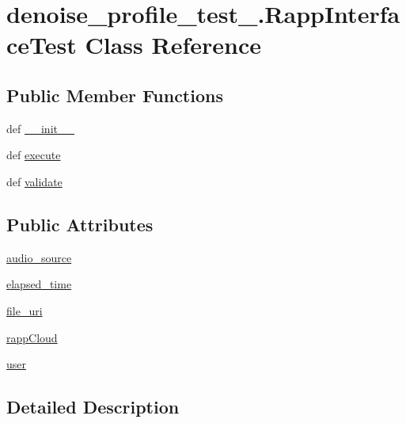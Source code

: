 \hypertarget{classdenoise__profile__test__1_1_1RappInterfaceTest}{\section{denoise\-\_\-profile\-\_\-test\-\_.\-Rapp\-Interface\-Test Class Reference}
\label{classdenoise__profile__test__1_1_1RappInterfaceTest}
}
\subsection*{Public Member Functions}
\begin{DoxyCompactItemize}
\item 
def \hyperlink{classdenoise__profile__test__1_1_1RappInterfaceTest_a95d3136e4eb658b68b3b0a6f5261e894}{\-\_\-\-\_\-init\-\_\-\-\_\-}
\item 
def \hyperlink{classdenoise__profile__test__1_1_1RappInterfaceTest_a6063fb0292a5a3d26ee9a4290620eb79}{execute}
\item 
def \hyperlink{classdenoise__profile__test__1_1_1RappInterfaceTest_abe05dd04f416ae56635628a2c5e87d8b}{validate}
\end{DoxyCompactItemize}
\subsection*{Public Attributes}
\begin{DoxyCompactItemize}
\item 
\hyperlink{classdenoise__profile__test__1_1_1RappInterfaceTest_ad84796cdde176cddc5df6f886e0dde23}{audio\-\_\-source}
\item 
\hyperlink{classdenoise__profile__test__1_1_1RappInterfaceTest_a4e96a1df5c42ebc673f166faf39e4985}{elapsed\-\_\-time}
\item 
\hyperlink{classdenoise__profile__test__1_1_1RappInterfaceTest_a5e3a08df19af52d974ee38f92c66cde7}{file\-\_\-uri}
\item 
\hyperlink{classdenoise__profile__test__1_1_1RappInterfaceTest_a4b2422c7955f281e70882cc2f91b3172}{rapp\-Cloud}
\item 
\hyperlink{classdenoise__profile__test__1_1_1RappInterfaceTest_affade8228735bf48bf678a94efd78f90}{user}
\end{DoxyCompactItemize}


\subsection{Detailed Description}


